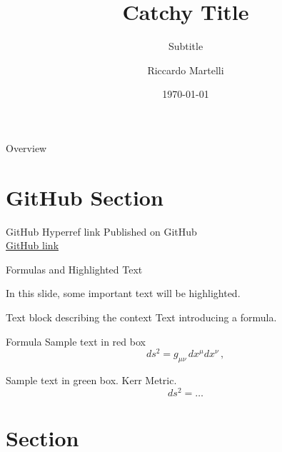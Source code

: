 \documentclass[aspectratio=169,xcolor=dvipsnames]{beamer}
\title{Catchy Title}
\subtitle{Subtitle}
\author{Riccardo Martelli}
\institute
{Institutions}
\date{\today}
\begin{document}
\begin{frame}
    \titlepage
\end{frame}

\begin{frame}{Overview}
    \tableofcontents
\end{frame}

\section{GitHub Section}

\begin{frame}{GitHub Hyperref link}
    \Huge Published on GitHub\\
    \href{https://github.com/Riccardo-Martelli/Riccardo-Beamer-Theme}{\faGithub GitHub link}
\end{frame}


\begin{frame}{Formulas and Highlighted Text}

    In this slide, some important text will be \alert{highlighted}.

    \begin{block}{Text block describing the context}
        Text introducing a formula.
    \end{block}

    \begin{alertblock}{Formula}
        Sample text in red box
        \[ds^2 = g_{\mu\nu}\, dx^\mu dx^\nu\,,\]
    \end{alertblock}

    \begin{examples}
        Sample text in green box. Kerr Metric.
        \[ds^2 = \dots\]
    \end{examples}

    
\end{frame}


\section{Section}
\end{document}
